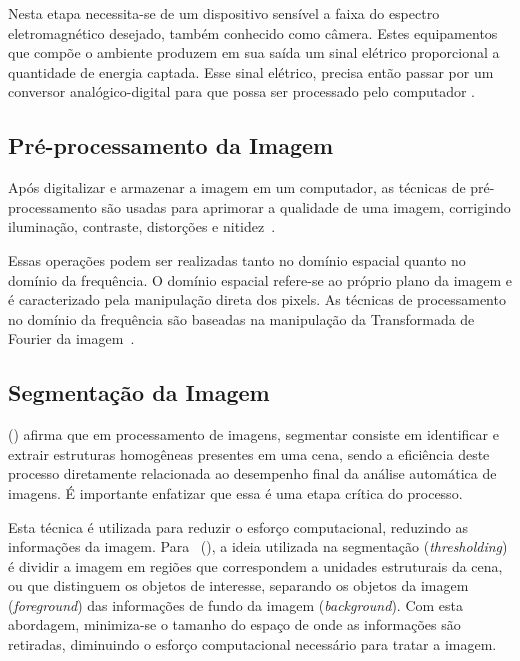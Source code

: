 Nesta etapa necessita-se de um dispositivo sensível a faixa do espectro eletromagnético desejado, também conhecido como câmera. Estes equipamentos que compõe o ambiente produzem em sua saída um sinal elétrico proporcional a quantidade de energia captada. Esse sinal elétrico, precisa então passar por um conversor analógico-digital para que possa ser processado pelo computador \cite{rogeralex1999}.

\subsection{Pré-processamento da Imagem}
\label{subsec:preProcImagem}

Após digitalizar e armazenar a imagem em um computador, as técnicas de pré-processamento são usadas para aprimorar a qualidade de uma imagem, corrigindo iluminação, contraste, distorções e nitidez~\cite{rudek2001visao}.

Essas operações podem ser realizadas tanto no domínio espacial quanto no domínio da frequência. O domínio espacial refere-se ao próprio plano da imagem e é caracterizado pela manipulação direta dos pixels. As técnicas de processamento no domínio da frequência são baseadas na manipulação da Transformada de Fourier da imagem~\cite{rogeralex1999}.

\subsection{Segmentação da Imagem}
\label{subsec:segImagem}

\citeauthor{heinen2004navegaccao} (\citeyear{heinen2004navegaccao}) afirma que em processamento de imagens, segmentar consiste em identificar e extrair estruturas homogêneas presentes em uma cena, sendo a eficiência deste processo diretamente relacionada ao desempenho final da análise automática de imagens. É importante enfatizar que essa é uma etapa crítica do processo.

Esta técnica é utilizada para reduzir o esforço computacional, reduzindo as informações da imagem. Para~\citeauthor{rudek2001visao} (\citeyear{rudek2001visao}), a ideia utilizada na segmentação (\textit{thresholding}) é dividir a imagem em regiões que correspondem a unidades estruturais da cena, ou que distinguem os objetos de interesse, separando os objetos da imagem (\textit{foreground}) das informações de fundo da imagem (\textit{background}). Com esta abordagem, minimiza-se o tamanho do espaço de onde as informações são retiradas, diminuindo o esforço computacional necessário para tratar a imagem.

